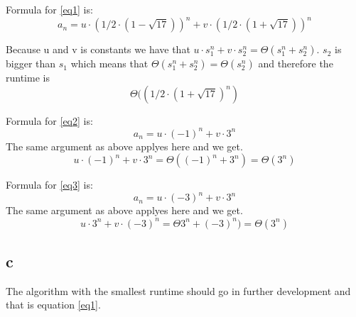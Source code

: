 \documentclass[a4paper]{article}
\begin{document}
Formula for \ref{eq1} is:
\[a_n=u \cdot (1/2 \cdot (1 - \sqrt{17}))^n + v \cdot (1/2 \cdot (1 + \sqrt{17}))^n\]

Because u and v is constants we have that \(u \cdot s_1^n + v \cdot s_2^n = \Theta (s_1^n + s_2^n)\). $s_2$ is bigger than $s_1$ which means that \(\Theta (s_1^n + s_2^n) = \Theta (s_2^n)\) and therefore the runtime is \[\Theta ((1/2 \cdot (1 + \sqrt{17})^n)\]


Formula for \ref{eq2} is:
\[a_n=u \cdot (-1)^n + v \cdot 3^n\]
The same argument as above applyes here and we get.
\[u \cdot (-1)^n + v \cdot 3^n = \Theta ((-1)^n + 3^n) = \Theta (3^n)\]


Formula for \ref{eq3} is:
\[a_n=u \cdot (-3)^n + v \cdot 3^n\]
The same argument as above applyes here and we get.
\[u \cdot 3^n + v \cdot (-3)^n = \Theta 3^n + (-3)^n) = \Theta (3^n)\]

\subsection*{c}
The algorithm with the smallest runtime should go in further development and that is equation \ref{eq1}.
\end{document}
